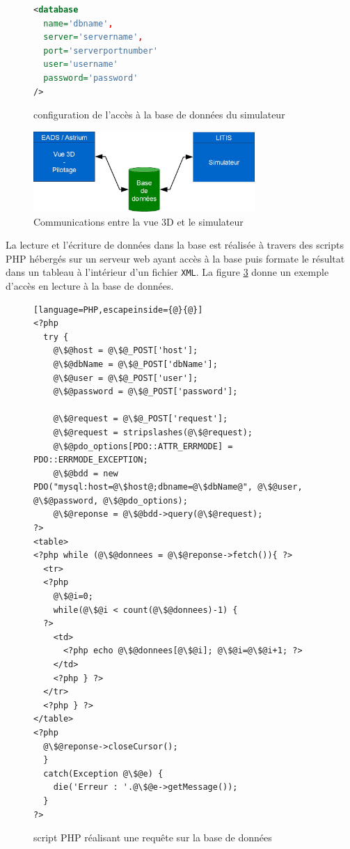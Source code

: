 \begin{figure}[ht]
\begin{lstlisting}[language=XML]
<database
  name='dbname',
  server='servername',
  port='serverportnumber'
  user='username'
  password='password'
/>
\end{lstlisting}
\caption{configuration de l'accès à la base de données du simulateur}
\label{fig:simulation:configDB}
\end{figure}

\begin{figure}[ht]
\centering
\includegraphics[width=0.75\textwidth]{chapitres/simulation/comEADSLITIS.jpg}
\caption{Communications entre la vue 3D et le simulateur}
\label{fig:simulation:comEADSLITIS}
\end{figure}

La lecture et l'écriture de données dans la base est réalisée à travers des scripts PHP hébergés sur un serveur web ayant accès à la base puis formate le résultat dans un tableau à l'intérieur d'un fichier \verb!XML!. La figure \ref{fig:simulation:scriptPHP} donne un exemple d'accès en lecture à la base de données.

\begin{figure}[ht]
\begin{lstlisting}[language=PHP,escapeinside={@}{@}]
<?php
  try {
    @\$@host = @\$@_POST['host'];
    @\$@dbName = @\$@_POST['dbName'];
    @\$@user = @\$@_POST['user'];
    @\$@password = @\$@_POST['password'];

    @\$@request = @\$@_POST['request'];
    @\$@request = stripslashes(@\$@request);
    @\$@pdo_options[PDO::ATTR_ERRMODE] = PDO::ERRMODE_EXCEPTION;
    @\$@bdd = new PDO("mysql:host=@\$host@;dbname=@\$dbName@", @\$@user, @\$@password, @\$@pdo_options);
    @\$@reponse = @\$@bdd->query(@\$@request);
?>
<table>
<?php while (@\$@donnees = @\$@reponse->fetch()){ ?>
  <tr>
  <?php
    @\$@i=0;
    while(@\$@i < count(@\$@donnees)-1) {
  ?>
    <td>
      <?php echo @\$@donnees[@\$@i]; @\$@i=@\$@i+1; ?>
    </td>
    <?php } ?>
  </tr>
  <?php } ?>
</table>
<?php
  @\$@reponse->closeCursor();
  }
  catch(Exception @\$@e) {
    die('Erreur : '.@\$@e->getMessage());
  }
?>
\end{lstlisting}
\caption{script PHP réalisant une requête sur la base de données}
\label{fig:simulation:scriptPHP}
\end{figure}

